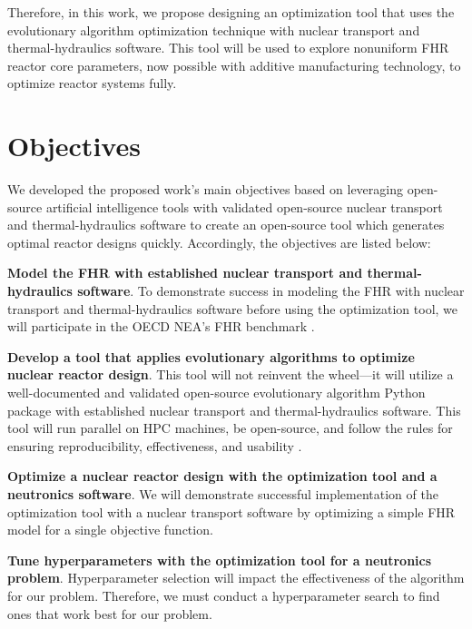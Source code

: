 Therefore, in this work, we propose designing an optimization tool that uses 
the evolutionary algorithm optimization technique with nuclear transport and 
thermal-hydraulics software. 
This tool will be used to explore nonuniform FHR reactor core parameters, now 
possible with additive manufacturing technology, to optimize reactor systems 
fully. 

\section{Objectives}
We developed the proposed work's main objectives based on leveraging 
open-source artificial intelligence tools with validated open-source nuclear 
transport and thermal-hydraulics software to create an open-source tool which 
generates optimal reactor designs quickly. 
Accordingly, the objectives are listed below:

\vspace{0.2cm} 
\noindent
\textbf{Model the \gls{FHR} with established 
nuclear transport and thermal-hydraulics software}.
To demonstrate success in modeling the \gls{FHR} with nuclear transport and 
thermal-hydraulics software before using the optimization tool, we will 
participate in the \gls{OECD} \gls{NEA}'s \gls{FHR} benchmark 
\cite{noauthor_fluoride_nodate}. 

\vspace{0.2cm} 
\noindent
\textbf{Develop a tool that applies evolutionary algorithms to optimize nuclear 
reactor design}. 
This tool will not reinvent the wheel---it will utilize a well-documented 
and validated open-source evolutionary algorithm Python package with established 
nuclear transport and thermal-hydraulics software. This tool will run parallel on 
\gls{HPC} machines, be open-source, and follow the rules for ensuring 
reproducibility, effectiveness, and usability 
\cite{list_ten_2017,osborne_ten_2014,sandve_ten_2013}. 

\vspace{0.2cm} 
\noindent
\textbf{Optimize a nuclear reactor design with the optimization tool and a 
neutronics software}. 
We will demonstrate successful implementation of the optimization tool with a
nuclear transport software by optimizing a simple \gls{FHR} model for a single 
objective function. 

\vspace{0.2cm} 
\noindent
\textbf{Tune hyperparameters with the optimization tool for a neutronics problem}.
Hyperparameter selection will impact the effectiveness of the algorithm 
for our problem. 
Therefore, we must conduct a hyperparameter search to find ones that work best 
for our problem. 

